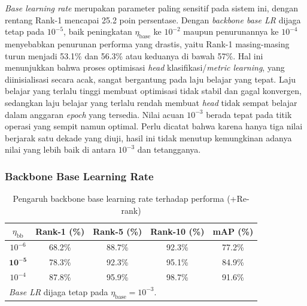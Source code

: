 \textit{Base learning rate} merupakan parameter paling sensitif pada sistem ini, dengan rentang Rank-1 mencapai 25.2 poin persentase. Dengan \textit{backbone base LR} dijaga tetap pada $10^{-5}$, baik peningkatan $\eta_{\text{base}}$ ke $10^{-2}$ maupun penurunannya ke $10^{-4}$ menyebabkan penurunan performa yang drastis, yaitu Rank-1 masing-masing turun menjadi 53.1\% dan 56.3\% atau keduanya di bawah 57\%. Hal ini menunjukkan bahwa proses optimisasi \textit{head} klasifikasi/\textit{metric learning}, yang diinisialisasi secara acak, sangat bergantung pada laju belajar yang tepat. Laju belajar yang terlalu tinggi membuat optimisasi tidak stabil dan gagal konvergen, sedangkan laju belajar yang terlalu rendah membuat \textit{head} tidak sempat belajar dalam anggaran \textit{epoch} yang tersedia. Nilai acuan $10^{-3}$ berada tepat pada titik operasi yang sempit namun optimal. Perlu dicatat bahwa karena hanya tiga nilai berjarak satu dekade yang diuji, hasil ini tidak menutup kemungkinan adanya nilai yang lebih baik di antara $10^{-3}$ dan tetangganya.

\subsubsection{Backbone Base Learning Rate}

\begin{table}[H]
    \centering
    \caption{Pengaruh backbone base learning rate terhadap performa (+Re-rank)}
    \label{tab:var_bblr}
    \renewcommand{\arraystretch}{1.25}
    \begin{tabular}{ccccc}
        \hline
        $\eta_{\text{bb}}$ & \textbf{Rank-1 (\%)} & \textbf{Rank-5 (\%)} & \textbf{Rank-10 (\%)} & \textbf{mAP (\%)} \\
        \hline
        $10^{-6}$          & 68.2\%               & 88.7\%               & 92.3\%                & 77.2\%            \\
        $\mathbf{10^{-5}}$ & 78.3\%               & 92.3\%               & 95.1\%                & 84.9\%            \\
        $10^{-4}$          & 87.8\%               & 95.9\%               & 98.7\%                & 91.6\%            \\
        \hline
        \multicolumn{5}{l}{\footnotesize \textit{Base LR} dijaga tetap pada $\eta_{\text{base}}=10^{-3}$.}           \\
    \end{tabular}
\end{table}

